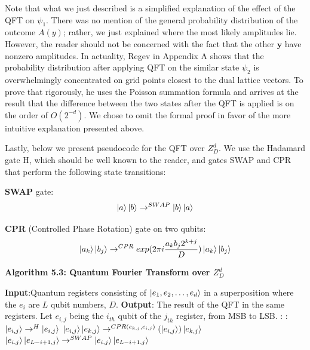 Note that what we just described is a simplified explanation of the effect of the QFT on $\psi_1$. There was no mention of the general probability distribution of the outcome $A(y)$; rather, we just explained where the most likely amplitudes lie. However, the reader should not be concerned with the fact that the other $\mathbf{y}$ have nonzero amplitudes. In actuality, Regev \cite{Regev2025} in Appendix A shows that the probability distribution after applying QFT on the similar state $\psi_2$ is overwhelmingly concentrated on grid points closest to the dual lattice vectors. To prove that rigorously, he uses the Poisson summation formula and arrives at the result that the difference between the two states after the QFT is applied is on the order of $O(2^{-d})$. We chose to omit the formal proof in favor of the more intuitive explanation presented above.

Lastly, below we present pseudocode for the QFT over $Z^d_D$. We use the Hadamard gate H, which should be well known to the reader, and gates SWAP and CPR that perform the following state transitions:

\textbf{SWAP} gate: $$\ket{a} \ket{b} \to^{SWAP} \ket{b} \ket{a}$$

\textbf{CPR} (Controlled Phase Rotation) gate on two qubits: $$\ket{a_k} \ket{b_j} \to^{CPR} exp(2\pi i \frac{a_k b_j 2^{k+j}}{D})\ket{a_k} \ket{b_j} $$




\noindent\textbf{Algorithm 5.3: Quantum Fourier Transform over $Z^d_D$}
\begin{algorithmic}[1]
\State \textbf{Input}:Quantum registers consisting of $\ket{e_1,e_2,\dots, e_d}$ in a 
superposition where the $e_i$ are $L$ qubit numbers, $D$.
\State \textbf{Output}: The result of the QFT in the same registers.
\State Let $e_{i,j}$ being the $i_{th}$ qubit of the $j_{th}$ register, from MSB to LSB.
:
    :
        \State $\ket{e_{i,j}} \to^{H} \ket{e_{i,j}}$
                \State $\ket{e_{i,j}}\ket{e_{k,j}} \to^{CPR(e_{k,j},e_{i,j})} (\ket{e_{i,j}})\ket{e_{k,j}}$ 
        \EndFor
    \EndFor
        \State $\ket{e_{i,j}}\ket{e_{L-i+1, j}} \to^{SWAP} \ket{e_{i,j}} \ket{e_{L-i+1, j}}$
    \EndFor
\EndFor

\end{algorithmic}



























